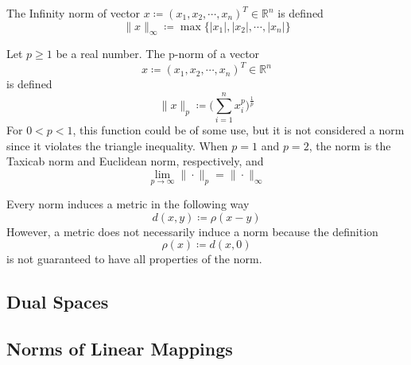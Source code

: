   \begin{example}
    \label{ex:infinity-norm-linfty-norm}
    The Infinity norm of vector $x \coloneqq (x_1, x_2, \cdots, x_n)^T \in \mathbb{R}^n$ is defined
    \begin{equation}
      \|x\|_\infty \coloneqq \max{\{|x_1|, |x_2|, \cdots, |x_n|\}}
    \end{equation}
  \end{example}

  \begin{example}
    \label{ex:p-norm-lp-norm}
    Let $p\geq 1$ be a real number. The p-norm of a vector 
    \begin{equation}
      x \coloneqq (x_1, x_2, \cdots, x_n)^T \in \mathbb{R}^n
    \end{equation}
    is defined
    \begin{equation}
      \|x\|_p \coloneqq \bigg( \sum_{i=1}^n x_i^p \bigg)^{\frac{1}{p}}
    \end{equation}
    For $0<p<1$, this function could be of some use, but it is not considered a norm since it violates the triangle inequality. When $p = 1$ and $p =2$, the norm is the Taxicab norm and Euclidean norm, respectively, and 
    \begin{equation}
      \lim_{p \rightarrow \infty} \|\cdot\|_p = \|\cdot\|_\infty
    \end{equation}
  \end{example}

  \begin{theorem}
    \label{thm:norm-induces-metric}
    Every norm induces a metric in the following way
    \begin{equation}
      d(x, y) \coloneqq \rho(x-y)
    \end{equation}
    However, a metric does not necessarily induce a norm because the definition
    \begin{equation}
      \rho(x) \coloneqq d(x, 0)
    \end{equation}
    is not guaranteed to have all properties of the norm. 
  \end{theorem}

\subsection{Dual Spaces}

\subsection{Norms of Linear Mappings}

